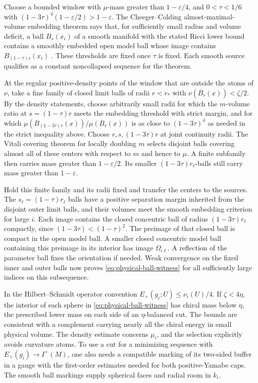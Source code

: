 Choose a bounded window with \(\mu\)-mass greater than
\(1-\varepsilon/4\), and \(0<\tau<1/6\) with
\((1-3\tau)^4(1-\varepsilon/2)>1-\varepsilon\).
The Cheeger--Colding almost-maximal-volume embedding theorem says
that, for sufficiently small radius and volume deficit, a ball
\(B_s(x_i)\) of a smooth manifold with the stated Ricci lower bound
contains a smoothly embedded open model ball whose image contains
\(B_{(1-\tau)s}(x_i)\)
\cite[Theorems~A.1.8--A.1.9]{CheegerColding1997StructureI}.
These thresholds are fixed once \(\tau\) is fixed. Each smooth
source qualifies as a constant noncollapsed sequence for the theorem.

At the regular positive-density points of the window that are
outside the atoms of \(\nu\), take a fine family of closed limit
balls of radii \(r<r_*\) with \(\nu(\overline B_r(x))<\zeta/2\).
By the density statements, choose arbitrarily small radii for
which the \(m\)-volume ratio at \(s=(1-\tau)r\) meets the embedding
threshold with strict margin, and for which
\(\mu(B_{(1-3\tau)r}(x))/\mu(B_r(x))\) is as close to
\((1-3\tau)^4\) as needed in the strict inequality above.
Choose \(r,s,(1-3\tau)r\) at joint continuity radii.
The Vitali covering theorem for locally doubling \(m\) selects
disjoint balls covering almost all of these centers with respect to
\(m\) and hence to \(\mu\). A finite subfamily then carries mass
greater than \(1-\varepsilon/2\). Its smaller
\((1-3\tau)r_\ell\)-balls still carry mass greater than
\(1-\varepsilon\).

Hold this finite family and its radii fixed and transfer the centers
to the sources. The \(s_\ell=(1-\tau)r_\ell\) balls have a positive
separation margin inherited from the disjoint outer limit balls,
and their volumes meet the smooth embedding criterion for large
\(i\). Each image contains the closed concentric ball of radius
\((1-3\tau)r_\ell\) compactly, since
\((1-3\tau)<(1-\tau)^2\). The preimage of that closed ball is
compact in the open model ball. A smaller closed concentric model
ball containing this preimage in its interior has image
\(\Omega_{i\ell}\). A reflection of the parameter ball fixes the
orientation if needed. Weak convergence on the fixed inner and
outer balls now proves \eqref{eq:physical-ball-witness} for all
sufficiently large indices on this subsequence.

In the Hilbert--Schmidt operator convention
\(E_+(g_i;U)\leq\nu_i(U)/4\). If \(\zeta<4\eta\), the interior of
each sphere in \eqref{eq:physical-ball-witness} has chiral mass
below \(\eta\), the prescribed lower mass on each side of an
\(\eta\)-balanced cut. The bounds are consistent with a complement
carrying nearly all the chiral energy in small physical volume.
The density estimate concerns \(\mu_i\), and the selection
explicitly avoids curvature atoms. To use a cut for a minimizing
sequence with \(E_+(g_i)\to I^+(M)\), one also needs a compatible
marking of its two-sided buffer in a gauge with the first-order
estimates needed for both positive-Yamabe caps. The smooth ball
markings supply spherical faces and radial room in \(k_i\).

